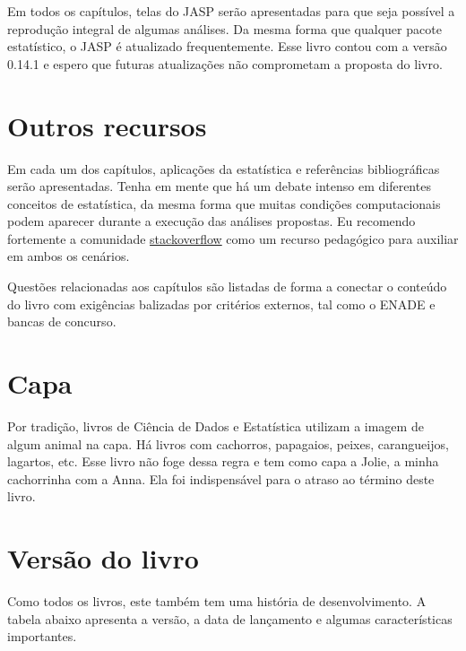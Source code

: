 \documentclass[
]{book}
\begin{document}
Em todos os capítulos, telas do JASP serão apresentadas para que seja possível a reprodução integral de algumas análises. Da mesma forma que qualquer pacote estatístico, o JASP é atualizado frequentemente. Esse livro contou com a versão 0.14.1 e espero que futuras atualizações não comprometam a proposta do livro.

\hypertarget{outros-recursos}{%
\section{Outros recursos}\label{outros-recursos}}

Em cada um dos capítulos, aplicações da estatística e referências bibliográficas serão apresentadas. Tenha em mente que há um debate intenso em diferentes conceitos de estatística, da mesma forma que muitas condições computacionais podem aparecer durante a execução das análises propostas. Eu recomendo fortemente a comunidade \href{https://stackoverflow.com/}{stackoverflow} como um recurso pedagógico para auxiliar em ambos os cenários.

Questões relacionadas aos capítulos são listadas de forma a conectar o conteúdo do livro com exigências balizadas por critérios externos, tal como o ENADE e bancas de concurso.

\hypertarget{capa}{%
\section{Capa}\label{capa}}

Por tradição, livros de Ciência de Dados e Estatística utilizam a imagem de algum animal na capa. Há livros com cachorros, papagaios, peixes, carangueijos, lagartos, etc. Esse livro não foge dessa regra e tem como capa a Jolie, a minha cachorrinha com a Anna. Ela foi indispensável para o atraso ao término deste livro.

\hypertarget{versuxe3o-do-livro}{%
\section{Versão do livro}\label{versuxe3o-do-livro}}

Como todos os livros, este também tem uma história de desenvolvimento. A tabela abaixo apresenta a versão, a data de lançamento e algumas características importantes.
\end{document}
